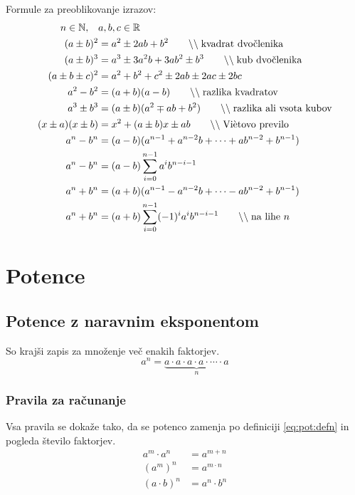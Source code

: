 \documentclass[a4paper,oneside,12pt,fleqn]{article}
\def\R{\ensuremath{\mathbb R}}
\def\N{\ensuremath{\mathbb N}}
\newcommand\krat\cdot
\newcommand{\comment}[1]{\ensuremath{\qquad\backslash\backslash\;}\textnormal{#1}}
\numberwithin{equation}{section}
\begin{document}
Formule za preoblikovanje izrazov:
\begin{align}
   n \in \N, \quad & a, b, c \in \R \\
   \label{eq:izr:kvadrat:dvoclenika} (a \pm b)^2 &= a^2 \pm 2ab + b^2 \comment{kvadrat
   dvočlenika} \\
   \label{eq:izr:kub:dvoclenika} (a \pm b)^3 &= a^3 \pm 3a^2b + 3ab^2 \pm b^3 \comment{kub
   dvočlenika} \\
   \label{eq:izr:kvadrat:troclenika} (a \pm b \pm c)^2 &= a^2 + b^2 + c^2 \pm 2ab \pm 2ac \pm 2bc \\
   \label{eq:izr:razlikakvadratov} a^2 - b^2 &= (a+b)(a-b) \comment{razlika kvadratov} \\
   \label{eq:izr:vsotakubov} a^3 \pm b^3 &= (a \pm b)(a^2 \mp ab + b^2) \comment{razlika ali
   vsota kubov} \\
   \label{eq:izr:vietovo} (x\pm a)(x\pm b) &= x^2 + (a\pm b)x \pm ab \comment{Viètovo
   previlo} \\
   \label{eq:izr:ananminusbnan} a^n - b^n &= (a - b)(a^{n-1} + a^{n-2}b + \cdots
   + ab^{n-2} + b^{n-1}) \\ 
   \label{eq:izr:ananminusbnansum} a^n - b^n &= (a - b)\sum_{i=0}^{n-1} a^ib^{n-i-1} \\
   \label{eq:izr:ananplubnan}  a^n + b^n &=  (a + b)(a^{n-1} - a^{n-2}b + \cdots
   - ab^{n-2} + b^{n-1}) \\
   \label{eq:izr:ananplusbnansum} a^n +b^n &= (a+b)\sum_{i=0}^{n-1} (-1)^ia^ib^{n-i-1}
   \comment{na lihe $n$}
\end{align}

\section{Potence}
\label{sec:pot}
\subsection{Potence z naravnim eksponentom}
\label{sec:pot:nar}
So krajši zapis za množenje več enakih faktorjev.
\begin{equation}
    a^n = \underbrace{a \krat a \krat a \krat a \krat \cdots \krat a}_n
    \label{eq:pot:defn}
\end{equation}

\subsubsection{Pravila za računanje}
\label{sec:pot:nar:prav}
Vsa pravila se dokaže tako, da se potenco zamenja po definiciji \eqref{eq:pot:defn} in
pogleda število faktorjev.
\begin{align}
  a^m \krat a^n &= a^{m+n} \label{eq:pot:anankratanam} \\
  (a^m)^n &= a^{m\krat n} \label{eq:pot:anannam} \\
  (a\krat b)^n &= a^n \krat b^n \label{eq:pot:akratbnan}
\end{align}
\end{document}
